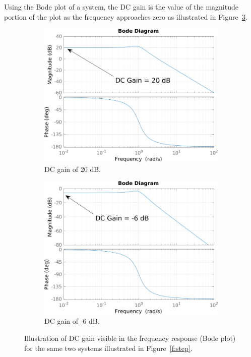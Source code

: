 \documentclass[11pt]{article}
\begin{document}
Using the Bode plot of a system, the DC gain is the value of the magnitude portion of the plot as the frequency approaches zero as illustrated in Figure~\ref{f:bode}.

\begin{figure}
\centering
\begin{subfigure}{.5\textwidth}
  \centering
  \includegraphics[width=\linewidth]{fig2.png}
  \caption{DC gain of 20 dB.}
  \label{fig:sub1}
\end{subfigure}%
\begin{subfigure}{.5\textwidth}
  \centering
  \includegraphics[width=\linewidth]{fig3.png}
  \caption{DC gain of -6 dB.}
  \label{fig:sub2}
\end{subfigure}
\caption{Illustration of DC gain visible in the frequency response (Bode plot) for the same two systems illustrated in Figure~\ref{f:step}.}
\label{f:bode}
\end{figure}
\end{document}
